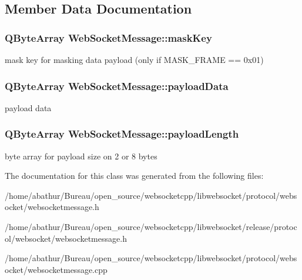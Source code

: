 \subsection{Member Data Documentation}
\hypertarget{class_web_socket_message_a0b0651e073c2998a609434e84fdb771d}{
\subsubsection[{mask\-Key}]{\setlength{\rightskip}{0pt plus 5cm}Q\-Byte\-Array Web\-Socket\-Message\-::mask\-Key}}\label{class_web_socket_message_a0b0651e073c2998a609434e84fdb771d}
mask key for masking data payload (only if M\-A\-S\-K\-\_\-\-F\-R\-A\-M\-E == 0x01) \hypertarget{class_web_socket_message_a99b2d16c9a26451b2655f7959ba8b4a1}{
\subsubsection[{payload\-Data}]{\setlength{\rightskip}{0pt plus 5cm}Q\-Byte\-Array Web\-Socket\-Message\-::payload\-Data}}\label{class_web_socket_message_a99b2d16c9a26451b2655f7959ba8b4a1}
payload data \hypertarget{class_web_socket_message_ade7a6305cbd4acba9508db94c7e8e183}{
\subsubsection[{payload\-Length}]{\setlength{\rightskip}{0pt plus 5cm}Q\-Byte\-Array Web\-Socket\-Message\-::payload\-Length}}\label{class_web_socket_message_ade7a6305cbd4acba9508db94c7e8e183}
byte array for payload size on 2 or 8 bytes 

The documentation for this class was generated from the following files\-:\begin{DoxyCompactItemize}
\item 
/home/abathur/\-Bureau/open\-\_\-source/websocketcpp/libwebsocket/protocol/websocket/websocketmessage.\-h\item 
/home/abathur/\-Bureau/open\-\_\-source/websocketcpp/libwebsocket/release/protocol/websocket/websocketmessage.\-h\item 
/home/abathur/\-Bureau/open\-\_\-source/websocketcpp/libwebsocket/protocol/websocket/websocketmessage.\-cpp\end{DoxyCompactItemize}
